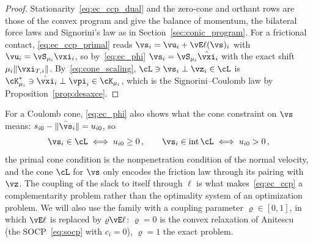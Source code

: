 %
\begin{proof}
	Stationarity~\eqref{eq:ec_ccp_dual} and the zero-cone and orthant rows are those of the convex program and give the balance of momentum, the bilateral force laws and Signorini's law as in Section~\ref{sec:conic_program}. For a frictional contact, \eqref{eq:ec_ccp_primal} reads $\vs_i = \vu_i + \vE\ell(\vs)_i$ with $\vu_i = \vS_{\mu_i}\vxi_i$, so by~\eqref{eq:ec_phi} $\vs_i = \vS_{\mu_i}\hat{\vxi}_i$ with the exact shift $\mu_i\|\vxi_{T,i}\|$. By~\eqref{eq:cone_scaling}, $\cL \ni \vs_i \perp \vz_i \in \cL$ is $\cK_{\mu_i}^* \ni \hat{\vxi}_i \perp \vpi_i \in \cK_{\mu_i}$, which is the Signorini--Coulomb law by Proposition~\ref{prop:desaxce}.
\end{proof}
%
For a Coulomb cone, \eqref{eq:ec_phi} also shows what the cone constraint on $\vs$ means: $s_{i0} - \|\bar{\vs}_i\| = u_{i0}$, so
%
\begin{equation}\label{eq:ec_interior}
	\vs_i \in \cL \iff u_{i0} \geq 0 \, , \qquad \vs_i \in \operatorname{int}\cL \iff u_{i0} > 0 \, ,
\end{equation}
%
the primal cone condition is the nonpenetration condition of the normal velocity, and the cone $\cL$ for $\vs$ only encodes the friction law through its pairing with $\vz$. The coupling of the slack to itself through $\ell$ is what makes~\eqref{eq:ec_ccp} a complementarity problem rather than the optimality system of an optimization problem. We will also use the family with a coupling parameter $\varrho \in [0, 1]$, in which $\vE\ell$ is replaced by $\varrho\vE\ell$: $\varrho = 0$ is the convex relaxation of Anitescu~\cite{Anitescu2006} (the SOCP~\eqref{eq:socp} with $c_i = 0$), $\varrho = 1$ the exact problem.
%

